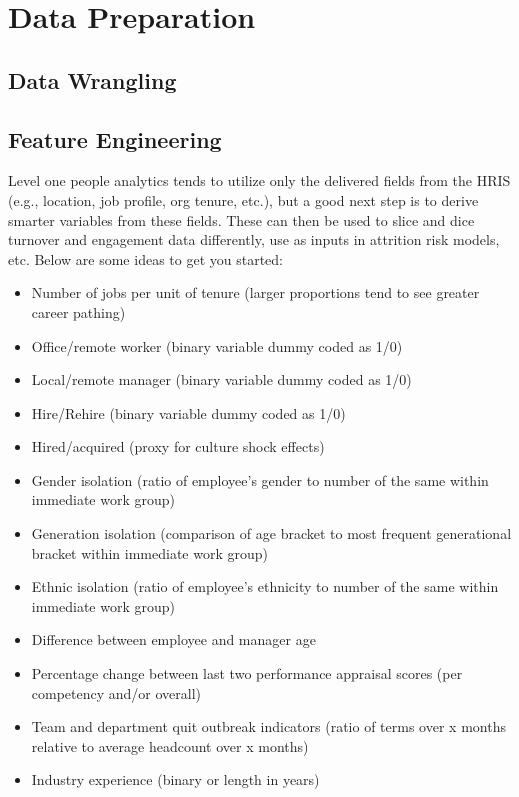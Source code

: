 \documentclass[]{book}
\providecommand{\tightlist}{%
  \setlength{\itemsep}{0pt}\setlength{\parskip}{0pt}}
\begin{document}
\hypertarget{data-preparation}{%
\chapter{Data Preparation}\label{data-preparation}}

\hypertarget{data-wrangling}{%
\section{Data Wrangling}\label{data-wrangling}}

\hypertarget{feature-engineering}{%
\section{Feature Engineering}\label{feature-engineering}}

Level one people analytics tends to utilize only the delivered fields from the HRIS (e.g., location, job profile, org tenure, etc.), but a good next step is to derive smarter variables from these fields. These can then be used to slice and dice turnover and engagement data differently, use as inputs in attrition risk models, etc. Below are some ideas to get you started:

\begin{itemize}
\tightlist
\item
  Number of jobs per unit of tenure (larger proportions tend to see greater career pathing)
\item
  Office/remote worker (binary variable dummy coded as 1/0)
\item
  Local/remote manager (binary variable dummy coded as 1/0)
\item
  Hire/Rehire (binary variable dummy coded as 1/0)
\item
  Hired/acquired (proxy for culture shock effects)
\item
  Gender isolation (ratio of employee's gender to number of the same within immediate work
  group)
\item
  Generation isolation (comparison of age bracket to most frequent generational bracket within
  immediate work group)
\item
  Ethnic isolation (ratio of employee's ethnicity to number of the same within immediate work
  group)
\item
  Difference between employee and manager age
\item
  Percentage change between last two performance appraisal scores (per competency and/or
  overall)
\item
  Team and department quit outbreak indicators (ratio of terms over x months relative to average
  headcount over x months)
\item
  Industry experience (binary or length in years)
\end{itemize}
\end{document}
